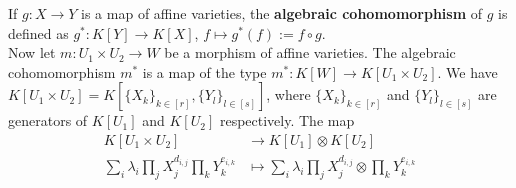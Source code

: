 \begin{definition}\label{coh}
  If $g \colon X \rightarrow Y$ is a map of affine varieties, the \textbf{algebraic cohomomorphism} of $g$ is defined as $g^\ast \colon K[Y] \rightarrow K[X]$, $f\mapsto g^\ast(f) := f \circ g$.  \\
  Now let $m \colon U_1 \times U_2 \rightarrow W$ be a morphism of affine varieties.
  The algebraic cohomomorphism $m^\ast$ is a map of the type $m^\ast \colon K[W] \rightarrow K[U_1 \times U_2]$.
  We have $ K[U_1 \times U_2] = K[\{X_k\}_{k\in[r]},\{Y_l\}_{l\in[s]}]$, where $\{X_k\}_{k\in[r]}$ and $\{Y_l\}_{l\in[s]}$ are generators of $K[U_1]$ and $K[U_2]$ respectively. 
  The map
    \begin{equation}
    \begin{aligned}
      K[U_1 \times U_2]
      & \longrightarrow K[U_1] \otimes K[U_2]\\
      \sum_i \lambda_i \prod_j X_{j}^{d_{i,j}} \prod_k Y_{k}^{e_{i,k}} &\longmapsto \sum_i \lambda_i \prod_j X_{j}^{d_{i,j}} \otimes \prod_k Y_{k}^{e_{i,k}}

\end{aligned}
\end{equation}
\end{definition}
